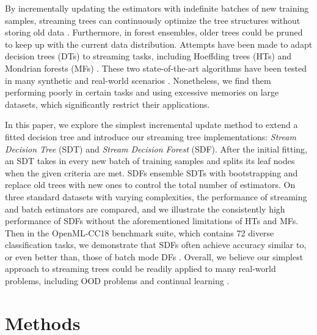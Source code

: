 By incrementally updating the estimators with indefinite batches of new training samples, streaming trees can continuously optimize the tree structures without storing old data \citep{domingos_mining_2000, bifet_adaptive_2009, lakshminarayanan_mondrian_2014, ben-haim_streaming_2010}. Furthermore, in forest ensembles, older trees could be pruned to keep up with the current data distribution. Attempts have been made to adapt decision trees (DTs) to streaming tasks, including Hoeffding trees (HTs) and Mondrian forests (MFs) \citep{domingos_mining_2000, lakshminarayanan_mondrian_2014}. These two state-of-the-art algorithms have been tested in many synthetic and real-world scenarios \citep{pfahringer_new_2007, gomes_machine_2019, lakshminarayanan_mondrian_2016, khannouz_benchmark_2020}. Nonetheless, we find them performing poorly in certain tasks and using excessive memories on large datasets, which significantly restrict their applications.

In this paper, we explore the simplest incremental update method to extend a fitted decision tree and introduce our streaming tree implementations: \textit{Stream Decision Tree} (SDT) and \textit{Stream Decision Forest} (SDF).
After the initial fitting, an SDT takes in every new batch of training samples and splits its leaf nodes when the given criteria are met. SDFs ensemble SDTs with bootstrapping and replace old trees with new ones to control the total number of estimators. 
On three standard datasets with varying complexities, the performance of streaming and batch estimators are compared, and we illustrate the consistently high performance of SDFs without the aforementioned limitations of HTs and MFs. Then in the OpenML-CC18 benchmark suite,
which contains 72 diverse classification tasks, we demonstrate that SDFs often achieve accuracy similar to, or even better than, those of batch mode DFs \citep{vanschoren_openml_2013, bischl_openml_2019}. Overall, we believe our simplest approach to streaming trees could be readily applied to many real-world problems, including OOD problems and continual learning \citep{geisa_towards_2021, van_de_ven_three_2019}.

\section{Methods} 
\label{methods}

